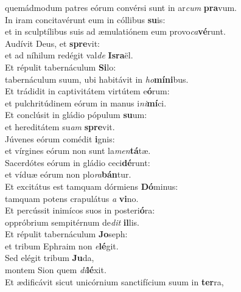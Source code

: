 \oddverse quemádmodum patres eórum convérsi sunt in ar\textit{cum} \textbf{pra}vum.\\
\evenverse In iram concitavérunt eum in cóllibus \textbf{su}is:~\*\\
\evenverse et in sculptílibus suis ad æmulatiónem eum provo\textit{ca}\textbf{vé}runt.\\
\oddverse Audívit Deus, et \textbf{spre}vit:~\*\\
\oddverse et ad níhilum redégit val\textit{de} \textbf{Is}\textbf{ra}ël.\\
\evenverse Et répulit tabernáculum \textbf{Si}lo:~\*\\
\evenverse tabernáculum suum, ubi habitávit in \textit{ho}\textbf{mí}\textbf{ni}bus.\\
\oddverse Et trádidit in captivitátem virtútem e\textbf{ó}rum:~\*\\
\oddverse et pulchritúdinem eórum in manus i\textit{ni}\textbf{mí}ci.\\
\evenverse Et conclúsit in gládio pópulum \textbf{su}um:~\*\\
\evenverse et hereditátem su\textit{am} \textbf{spre}vit.\\
\oddverse Júvenes eórum comédit \textbf{i}gnis:~\*\\
\oddverse et vírgines eórum non sunt la\textit{men}\textbf{tá}tæ.\\
\evenverse Sacerdótes eórum in gládio ceci\textbf{dé}runt:~\*\\
\evenverse et víduæ eórum non plo\textit{ra}\textbf{bán}tur.\\
\oddverse Et excitátus est tamquam dórmiens \textbf{Dó}minus:~\*\\
\oddverse tamquam potens crapulátus \textit{a} \textbf{vi}no.\\
\evenverse Et percússit inimícos suos in posteri\textbf{ó}ra:~\*\\
\evenverse oppróbrium sempitérnum de\textit{dit} \textbf{il}lis.\\
\oddverse Et répulit tabernáculum \textbf{Jo}seph:~\*\\
\oddverse et tribum Ephraim non \textit{e}\textbf{lé}git.\\
\evenverse Sed elégit tribum \textbf{Ju}da,~\*\\
\evenverse montem Sion quem \textit{di}\textbf{lé}xit.\\
\oddverse Et ædificávit sicut unicórnium sanctifícium suum in \textbf{ter}ra,~\*\\
